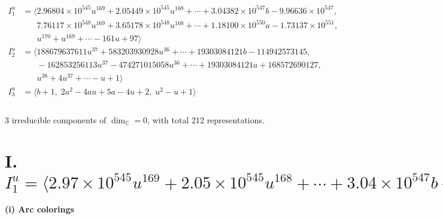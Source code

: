 \documentclass[1p]{elsarticle_modified}
\theoremstyle{definition}
\begin{document}
\begin{align*}
I^u_{1}&=\langle 
2.96804\times10^{545} u^{169}+2.05449\times10^{545} u^{168}+\cdots+3.04382\times10^{547} b-9.96636\times10^{547},\\
\phantom{I^u_{1}}&\phantom{= \langle  }7.76117\times10^{548} u^{169}+3.65178\times10^{548} u^{168}+\cdots+1.18100\times10^{550} a-1.73137\times10^{551},\\
\phantom{I^u_{1}}&\phantom{= \langle  }u^{170}+u^{169}+\cdots-161 u+97\rangle \\
I^u_{2}&=\langle 
188679637611 u^{37}+583203930928 u^{36}+\cdots+19303084121 b-114942573145,\\
\phantom{I^u_{2}}&\phantom{= \langle  }-162853256113 u^{37}-474271015058 u^{36}+\cdots+19303084121 a+168572690127,\\
\phantom{I^u_{2}}&\phantom{= \langle  }u^{38}+4 u^{37}+\cdots- u+1\rangle \\
I^u_{3}&=\langle 
b+1,\;2 a^2-4 a u+5 a-4 u+2,\;u^2- u+1\rangle \\
\\
\end{align*}
\raggedright * 3 irreducible components of $\dim_{\mathbb{C}}=0$, with total 212 representations.\\
\newpage
\renewcommand{\arraystretch}{1}
\centering \section*{I. $I^u_{1}= \langle 2.97\times10^{545} u^{169}+2.05\times10^{545} u^{168}+\cdots+3.04\times10^{547} b-9.97\times10^{547},\;7.76\times10^{548} u^{169}+3.65\times10^{548} u^{168}+\cdots+1.18\times10^{550} a-1.73\times10^{551},\;u^{170}+u^{169}+\cdots-161 u+97 \rangle$}
\flushleft \textbf{(i) Arc colorings}\\
\end{document}
